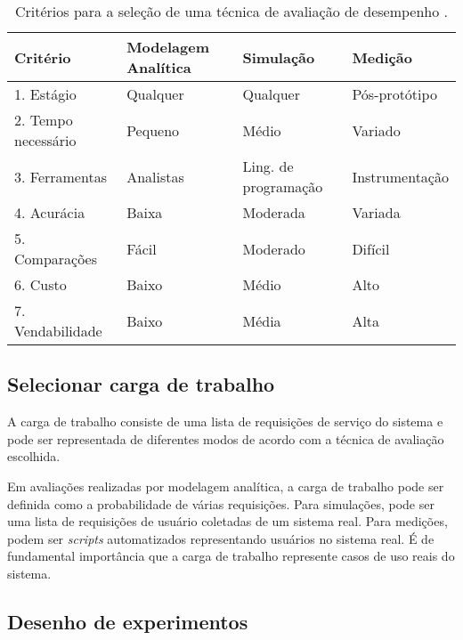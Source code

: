 \begin{table}
  \centering
  \begin{tabular}{llll}
    \toprule
    Critério            & Modelagem Analítica & Simulação            & Medição        \\
    \midrule
    1. Estágio          & Qualquer            & Qualquer             & Pós-protótipo  \\
    2. Tempo necessário & Pequeno             & Médio                & Variado        \\
    3. Ferramentas      & Analistas           & Ling. de programação & Instrumentação \\
    4. Acurácia         & Baixa               & Moderada             & Variada        \\
    5. Comparações      & Fácil               & Moderado             & Difícil        \\
    6. Custo            & Baixo               & Médio                & Alto           \\
    7. Vendabilidade    & Baixo               & Média                & Alta           \\
    \bottomrule
  \end{tabular}
  \caption{Critérios para a seleção de uma técnica de avaliação de desempenho \cite{jain1991art}.}
  \label{tab:analysistech}
\end{table}

\subsection{Selecionar carga de trabalho}

A carga de trabalho consiste de uma lista de requisições de serviço do sistema e pode ser representada de diferentes modos de acordo com a técnica de avaliação escolhida.

Em avaliações realizadas por modelagem analítica, a carga de trabalho pode ser definida como a probabilidade de várias requisições. Para simulações, pode ser uma lista de requisições de usuário coletadas de um sistema real. Para medições, podem ser \textit{scripts} automatizados representando usuários no sistema real. É de fundamental importância que a carga de trabalho represente casos de uso reais do sistema.

\subsection{Desenho de experimentos}

